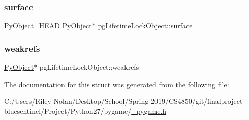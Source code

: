 \subsubsection{\texorpdfstring{surface}{surface}}
{\footnotesize\ttfamily \mbox{\hyperlink{_python27_2object_8h_a0bf35c1f3ea13f925de94d8593db3b7e}{Py\+Object\+\_\+\+H\+E\+AD}} \mbox{\hyperlink{_python27_2object_8h_aadc84ac7aed2cfa6f20c25f62bf3dac7}{Py\+Object}}$\ast$ pg\+Lifetime\+Lock\+Object\+::surface}

\mbox{\label{structpg_lifetime_lock_object_a44b00b87ed039f7638aae5c8fc1430ec}} 
\subsubsection{\texorpdfstring{weakrefs}{weakrefs}}
{\footnotesize\ttfamily \mbox{\hyperlink{_python27_2object_8h_aadc84ac7aed2cfa6f20c25f62bf3dac7}{Py\+Object}}$\ast$ pg\+Lifetime\+Lock\+Object\+::weakrefs}



The documentation for this struct was generated from the following file\+:\begin{DoxyCompactItemize}
\item 
C\+:/\+Users/\+Riley Nolan/\+Desktop/\+School/\+Spring 2019/\+C\+S4850/git/finalproject-\/bluesentinel/\+Project/\+Python27/pygame/\mbox{\hyperlink{__pygame_8h}{\+\_\+pygame.\+h}}\end{DoxyCompactItemize}
